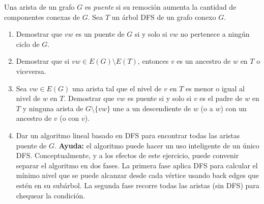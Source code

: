 


 \item\Obligatorio Una arista de un grafo $G$ es \emph{puente} si su remoción aumenta la cantidad de componentes conexas de $G$.  Sea $T$ un árbol DFS de un grafo conexo $G$.\label{ej:puentes}
 
 \begin{enumerate}[label=$\alph*)$,ref=$\alph*)$]
   \item Demostrar que $vw$ es un puente de $G$ si y solo si $vw$ no pertenece a ningún ciclo de $G$.
 
   \item Demostrar que si $vw \in E(G) \setminus E(T)$, entonces $v$ es un ancestro de $w$ en $T$ o viceversa.\label{ej:puentes:arista-no-dfs}
   
   \item Sea $vw \in E(G)$ una arista tal que el nivel de $v$ en $T$ es menor o igual al nivel de $w$ en $T$.  Demostrar que $vw$ es puente si y solo si $v$ es el padre de $w$ en $T$ y ninguna arista de $G \setminus \{vw\}$ une a un descendiente de $w$ (o a $w$) con un ancestro de $v$ (o con $v$).
   
   \item Dar un algoritmo lineal basado en DFS para encontrar todas las aristas puente de $G$. \textbf{Ayuda:} el algoritmo puede hacer un uso inteligente de un único DFS.  Conceptualmente, y a los efectos de este ejercicio, puede convenir separar el algoritmo en dos fases. La primera fase aplica DFS para calcular el mínimo nivel que se puede alcanzar desde cada vértice usando back edges que estén en su subárbol. La segunda fase recorre todas las aristas (sin DFS) para chequear la condición.
 \end{enumerate}




